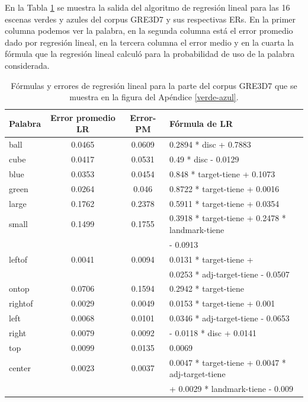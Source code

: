 En la Tabla \ref{tabla-linear-regresion-all} se muestra la salida del algoritmo de regresi\'on lineal para las 16 escenas verdes y azules del corpus GRE3D7 y sus respectivas ERs. En la primer columna podemos ver la palabra, 
en la segunda columna est\'a el error promedio dado por regresi\'on lineal, en la tercera columna el error medio 
y en la cuarta la f\'ormula que la regresi\'on lineal calcul\'o para la probabilidad de uso de la palabra considerada.
\medskip
\begin{table}[h]
\begin{center}
\begin{tabular}{|l|c|c|l|}
\hline
Palabra &Error promedio	LR	& Error-PM	& F\'ormula de LR\\
\hline
ball		 &0.0465   &0.0609	  & 0.2894 * disc + 0.7883\\
\hline
cube		 &0.0417	 &0.0531	  &0.49   * disc - 0.0129\\
\hline
\hline
blue		 &0.0353	 &0.0454	  &0.848  * target-tiene + 0.1073\\
\hline
green		 &0.0264	 &0.046	    &0.8722 * target-tiene + 0.0016\\
\hline
\hline
large		 &0.1762	 &0.2378	  &0.5911 * target-tiene + 0.0354\\
\hline
small		 &0.1499	 &0.1755	  &0.3918 * target-tiene + 0.2478 * landmark-tiene\\
				 &				 &					&- 0.0913\\
\hline
\hline
leftof  &0.0041	 &0.0094	  &0.0131 * target-tiene +\\
				 &				 &					&0.0253 * adj-target-tiene - 0.0507\\
\hline
ontop	 &0.0706	 &0.1594	  &0.2942 * target-tiene \\
\hline
rightof &0.0029	 &0.0049	  &0.0153 * target-tiene + 0.001\\
\hline
\hline
left		 &0.0068	 &0.0101	  &0.0346 * adj-target-tiene - 0.0653\\
\hline
right		 &0.0079	 &0.0092	  &- 0.0118 * disc + 0.0141\\
\hline
top    &0.0099 	 &0.0135		& 0.0069\\
\hline
center	 &0.0023	 &0.0037	  &0.0047 * target-tiene + 0.0047 * adj-target-tiene\\
				 &				 &					&+ 0.0029 * landmark-tiene - 0.009\\
\hline
\end{tabular}
\caption{F\'ormulas y errores de regresi\'on lineal para la parte del corpus GRE3D7 que se muestra en la figura del Ap\'endice \ref{verde-azul}.}
\label{tabla-linear-regresion-all}
\end{center}
\end{table}

